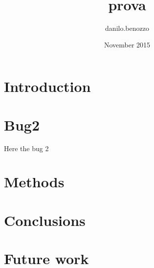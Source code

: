 \documentclass{article}
\title{prova}
\author{danilo.benozzo }
\date{November 2015}
\begin{document}
\maketitle

\section{Introduction}


\section{Bug2}
Here the bug 2

\section{Methods}

\section{Conclusions}

\section{Future work}
\end{document}
